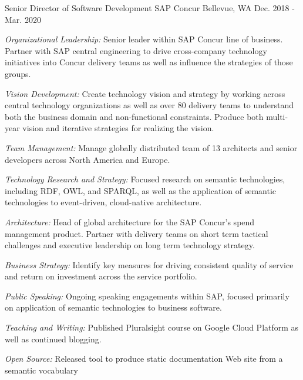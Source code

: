 \begin{cventries}
\cventry
{Senior Director of Software Development} %
{SAP Concur} %
{Bellevue, WA} %
{Dec. 2018 - Mar. 2020} %
{ %
\begin{cvitems}
\item {\emph{Organizational Leadership:} Senior leader within SAP Concur line of business. Partner with SAP central engineering to drive cross-company technology initiatives into Concur delivery teams as well as influence the strategies of those groups. }
\item {\emph{Vision Development:} Create technology vision and strategy by working across central technology organizations as well as over 80 delivery teams to understand both the business domain and non-functional constraints. Produce both multi-year vision and iterative strategies for realizing the vision.}
\item {\emph{Team Management:} Manage globally distributed team of 13 architects and senior developers across North America and Europe.}
\item {\emph{Technology Research and Strategy:} Focused research on semantic technologies, including RDF, OWL, and SPARQL, as well as the application of semantic technologies to event-driven, cloud-native architecture.}
\item {\emph{Architecture:} Head of global architecture for the SAP Concur’s spend management product. Partner with delivery teams on short term tactical challenges and executive leadership on long term technology strategy.}
\item {\emph{Business Strategy:} Identify key measures for driving consistent quality of service and return on investment across the service portfolio.}
\item {\emph{Public Speaking:} Ongoing speaking engagements within SAP, focused primarily on application of semantic technologies to business software.}
\item {\emph{Teaching and Writing:} Published Pluralsight course on Google Cloud Platform as well as continued blogging.}
\item {\emph{Open Source:} Released tool to produce static documentation Web site from a semantic vocabulary}
\end{cvitems}
}



\end{cventries}
